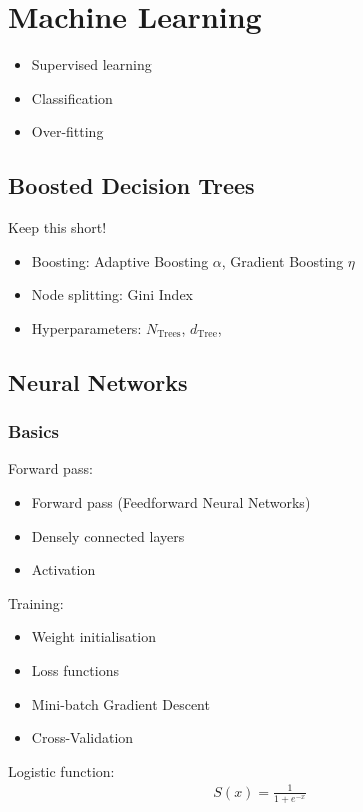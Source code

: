 \chapter{Machine Learning}
\label{sec:ml}

\begin{itemize}
\item Supervised learning
\item Classification
\item Over-fitting
\end{itemize}

\section{Boosted Decision Trees}
\label{sec:bdt}

Keep this short!

\begin{itemize}
\item Boosting: Adaptive Boosting $\alpha$, Gradient Boosting $\eta$
\item Node splitting: Gini Index
\item Hyperparameters: $N_\mathrm{Trees}$, $d_\mathrm{Tree}$,
\end{itemize}

\section{Neural Networks}
\label{sec:nn}

\subsection{Basics}
\label{sec:nn_basics}

Forward pass:
\begin{itemize}
\item Forward pass (Feedforward Neural Networks)
\item Densely connected layers
\item Activation
\end{itemize}
Training:
\begin{itemize}
\item Weight initialisation
\item Loss functions
\item Mini-batch Gradient Descent
\item Cross-Validation
\end{itemize}

Logistic function:
\begin{align*}
  S(x) = \frac{1}{1 + e^{-x}}
\end{align*}

